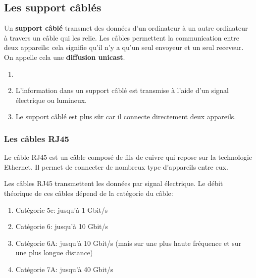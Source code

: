 \documentclass[11pt, a4paper]{book}
\begin{document}


\subsection{Les support câblés}


\begin{defi}
Un {\bf support câblé} transmet des données d'un ordinateur à un autre ordinateur à travers un câble qui les relie.  Les câbles permettent la communication entre deux appareils: cela signifie qu'il n'y a qu'un seul envoyeur et un seul receveur. On appelle cela une {\bf diffusion unicast}.
\end{defi}

\begin{remarques}
\begin{enumerate}
\item[]
\item  L'information dans un support câblé est transmise à l'aide d'un signal électrique ou lumineux.
\item Le support câblé est plus sûr car il connecte directement deux appareils. 
\end{enumerate}

\end{remarques}

\subsubsection{Les câbles RJ45}




Le câble RJ45 est un câble composé de fils de cuivre qui repose sur la technologie Ethernet. Il permet de connecter de nombreux type d'appareils entre eux. 

Les câbles RJ45 transmettent les données par signal électrique. Le débit théorique de ces câbles dépend de la catégorie du câble:
\begin{enumerate}
\item Catégorie 5e: jusqu'à 1 Gbit/s
\item Catégorie 6: jusqu'à 10 Gbit/s
\item Catégorie 6A: jusqu'à 10 Gbit/s (mais sur une plus haute fréquence et sur une plus longue distance)
\item Catégorie 7A: jusqu'à 40 Gbit/s
\end{enumerate}
\end{document}
